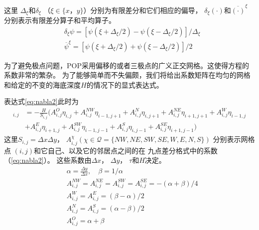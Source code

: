 这里 $\Delta_\xi$和$\delta_\xi$  （$\xi \in \{x， y\} $）分别为有限差分和它们相应的偏导，  $\delta_\xi (\cdot) $和$\overline{(\cdot)}^\xi $ 分别表示有限差分算子和平均算子。  
\begin{align}
&\delta_\xi \psi = [\psi (\xi+\Delta_\xi/2) -\psi(\xi-\Delta_\xi/2)]/\Delta_\xi \\
&\overline{\psi}^\xi  =[\psi (\xi+\Delta_\xi/2) +\psi(\xi-\Delta_\xi/2)]/2
\end{align}


为了避免极点问题，POP采用偏移的或者三极点的广义正交网格。这使得方程的系数非常的繁杂。
为了能够简单而不失偏颇，我们将给出系数矩阵在均匀的网格和给定的不变的海底深度$H$的情况下的显式表达式。
 

表达式\ref{eq:nabla2}此时为
\begin{align}
 [\nabla\cdot H \nabla \eta]_{i,j}&= -\frac{H}{S_{i,j}}(A_{i,j}^O\eta_{i,j}+A_{i,j}^{NW}\eta_{i-1,j+1}+A_{i,j}^N\eta_{i,j+1} +A_{i,j}^{NE}\eta_{i+1,j+1}+A_{i,j}^W\eta_{i-1,j}  \nonumber\\
& +A_{i,j}^E\eta_{i+1,j} +A_{i,j}^{SW}\eta_{i-1,j-1} +A_{i,j}^S\eta_{i,j-1}+ A_{i,j}^{SE}\eta_{i+1,j-1})
\end{align}
这里$S_{i,j}  = \Delta x\Delta y$， $A_{i,j}^{\chi } ( \chi \in \mathcal{Q} = \{NW,NE, SW, SE, W, E, N, S\})$ 分别表示网格点 $(i,j)$和它自己、以及它的邻居点之间的在 九点差分格式中的系数（\ref{eq:nabla2}）。 这些系数由$\Delta x$， $\Delta y$， $\tau$和$H$决定。
\begin{equation} \label{defineA}
\begin{aligned}
&\alpha  = \frac{ \Delta y}{ \Delta x }, \quad \beta  = 1/\alpha \\
&A_{i,j}^{NW} = A_{i,j}^{NE} =A_{i,j}^{SW} = A_{i,j}^{SE} = - (\alpha  +  \beta  )/4 \\
&A_{i,j}^{W} = A_{i,j}^{E} = (  \beta  -\alpha  )/2 \\
&A_{i,j}^{N} = A_{i,j}^{S} = (\alpha  -\beta )/2 \\
&A_{i,j}^{O} =   \alpha   +\beta  \\
\end{aligned}
\end{equation}


